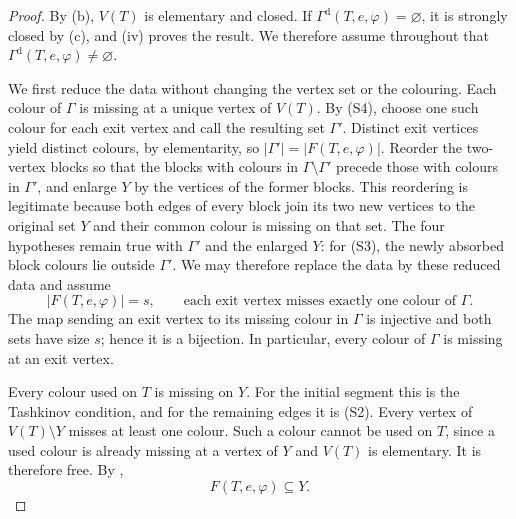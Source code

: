 \documentclass[11pt]{article}
\theoremstyle{definition}
\newcommand{\Dcol}{\Gamma^{\mathrm d}}
\newcommand{\comp}{\mathbin{\setminus}}
\begin{document}
\begin{proof}
By (b), $V(T)$ is elementary and closed. If
$\Dcol(T,e,\varphi)=\varnothing$, it is strongly closed by
(c), and (iv) proves the result.
We therefore assume throughout that
$\Dcol(T,e,\varphi)\ne\varnothing$.

We first reduce the data without changing the vertex set or the colouring.
Each colour of $\Gamma$ is missing at a unique vertex of $V(T)$. By (S4),
choose one such colour for each exit vertex and call the resulting set
$\Gamma'$. Distinct exit vertices yield distinct colours, by elementarity,
so $|\Gamma'|=|F(T,e,\varphi)|$. Reorder the two-vertex blocks so that the
blocks with colours in $\Gamma\comp\Gamma'$ precede those with colours in
$\Gamma'$, and enlarge $Y$ by the vertices of the former blocks. This
reordering is legitimate because both edges of every block join its two new
vertices to the original set $Y$ and their common colour is missing on that
set. The four hypotheses remain true with $\Gamma'$ and the enlarged $Y$:
for (S3), the newly absorbed block colours lie outside $\Gamma'$. We may
therefore replace the data by these reduced data and assume
\begin{equation}
 |F(T,e,\varphi)|=s,
 \qquad
 \text{each exit vertex misses exactly one colour of $\Gamma$.}
 \tag{1}\label{L41-1}
\end{equation}
The map sending an exit vertex to its missing colour in $\Gamma$ is
injective and both sets have size $s$; hence it is a bijection. In
particular, every colour of $\Gamma$ is missing at an exit vertex.

Every colour used on $T$ is missing on $Y$. For the initial segment this is
the Tashkinov condition, and for the remaining edges it is (S2). Every
vertex of $V(T)\comp Y$ misses at least one colour. Such a colour cannot be
used on $T$, since a used colour is already missing at a vertex of $Y$ and
$V(T)$ is elementary. It is therefore free. By ,
\begin{equation}
 F(T,e,\varphi)\subseteq Y.
 \tag{2}\label{L41-2}
\end{equation}


\end{proof}
\end{document}
